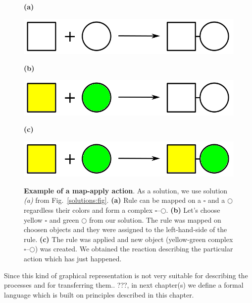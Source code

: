 \documentclass[12pt]{fithesis2}
\begin{document}
\begin{figure}
\begin{center}
\begin{minipage}[l]{0.1\textwidth}
    \textbf{(a)}
  \end{minipage}
  \begin{minipage}[r]{0.6\textwidth}
    {\hspace*{1.3cm}\includegraphics[scale=0.2]{rule_complex}}
\end{minipage}

\begin{minipage}[l]{0.1\textwidth}
    \textbf{(b)}
  \end{minipage}
  \begin{minipage}[r]{0.6\textwidth}
    {\hspace*{1.3cm}\includegraphics[scale=0.2]{rule_complex_mapped}}
\end{minipage}

\begin{minipage}[l]{0.1\textwidth}
    \textbf{(c)}
  \end{minipage}
  \begin{minipage}[r]{0.6\textwidth}
    {\hspace*{1.3cm}\includegraphics[scale=0.2]{rule_reaction}}
\end{minipage}
\caption{\textbf{Example of a map-apply action}. As a solution, we use solution \textit{(a)} from Fig.~\ref{solutions:fig}. \textbf{(a)} Rule can be mapped on a $\square$ and a $\bigcirc$ regardless their colors and form a complex $\square$--$\bigcirc$.  \textbf{(b)} Let's choose yellow $\square$ and green $\bigcirc$ from our solution. The rule was mapped on choosen objects and they were assigned to the left-hand-side of the rule. \textbf{(c)} The rule was applied and new object (yellow-green complex $\square$--$\bigcirc$) was created. We obtained the reaction describing the particular action which has just happened.}
\label{map-apply:fig}
\end{center}
\end{figure}

Since this kind of graphical representation is not very suitable for describing the processes and for transferring them.. ???, in next chapter(s) we define a formal language which is built on principles described in this chapter.

\printbibliography
\end{document}

